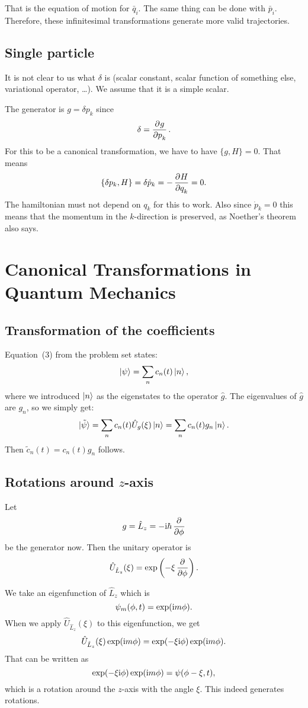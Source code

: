 \documentclass[11pt, ngerman, fleqn, DIV=15, headinclude, BCOR=1cm]{scrartcl}
\begin{document}
That is the equation of motion for $\bar q_i$. The same thing can be done with
$\bar p_i$. Therefore, these infinitesimal transformations generate more valid
trajectories.

\subsection{Single particle}

It is not clear to us what $\delta$ is (scalar constant, scalar function of
something else, variational operator, …). We assume that it is a simple scalar.

The generator is $g = \delta p_k$ since
\[
    \delta = \dpd{g}{p_k}.
\]
For this to be a canonical transformation, we have to have $\{g, H\} = 0$. That
means
\[
    \{\delta p_k, H\} = \delta \dot p_k = - \dpd{H}{q_k} = 0.
\]
The hamiltonian must not depend on $q_k$ for this to work. Also since $\dot p_k
= 0$ this means that the momentum in the $k$-direction is preserved, as
Noether's theorem also says.

\section{Canonical Transformations in Quantum Mechanics}

\subsection{Transformation of the coefficients}

Equation~(3) from the problem set states:
\[
    \ket \psi = \sum_n c_n(t) \ket n,
\]
where we introduced $\ket n$ as the eigenstates to the operator $\hat g$. The
eigenvalues of $\hat g$ are $g_n$, so we simply get:
\[
    \ket{\tilde \psi}
    = \sum_n c_n(t) \hat U_g(\xi) \ket n
    = \sum_n c_n(t) g_n \ket n.
\]
Then $\tilde c_n(t) = c_n(t) g_n$ follows.

\subsection{Rotations around $z$-axis}

Let
\[
    g = \hat L_z = - \iup \hbar \dpd{}\phi
\]
be the generator now. Then the unitary operator is
\[
    \hat U_{\hat L_z}(\xi) = \exp\del{- \xi \dpd{}\phi}.
\]

We take an eigenfunction of $\hat L_z$ which is
\[
    \psi_m(\phi, t) = \exp(\mathrm i m \phi).
\]
When we apply $\hat U_{\hat L_z}(\xi)$ to this eigenfunction, we get
\[
    \hat U_{\hat L_z}(\xi) \exp(\mathrm i m \phi) = \exp(-\xi \mathrm i \phi) \exp(\mathrm i m \phi).
\]
That can be written as
\[
    \exp(-\xi \mathrm i \phi) \exp(\mathrm i m \phi) = \psi(\phi - \xi, t),
\]
which is a rotation around the $z$-axis with the angle $\xi$. This indeed
generates rotations.
\end{document}
